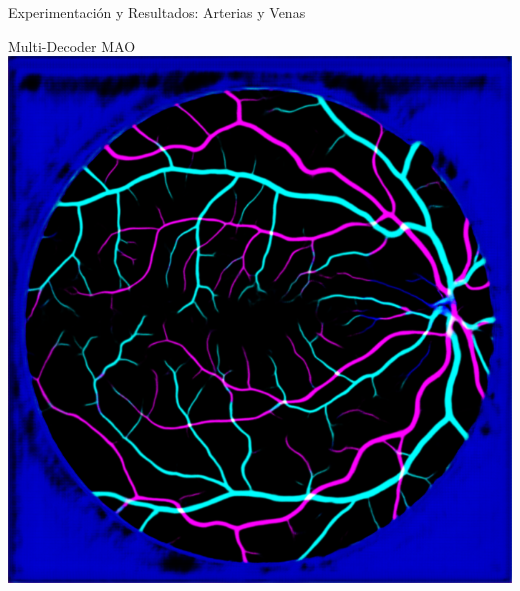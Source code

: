 \documentclass[xcolor=dvipsnames,table]{beamer}
\begin{document}
\begin{frame}{Experimentación y Resultados: Arterias y Venas}
\begin{minipage}[b]{0.13\textwidth}
	\end{minipage}\hfill
	\begin{minipage}[b]{0.13\textwidth}
		\centering
		Multi-Decoder MAO\\[0.2cm]
		\includegraphics[width=\linewidth]{my_images/video/AVMULTIMAO.png}
	\end{minipage}
\end{frame}
\end{document}
